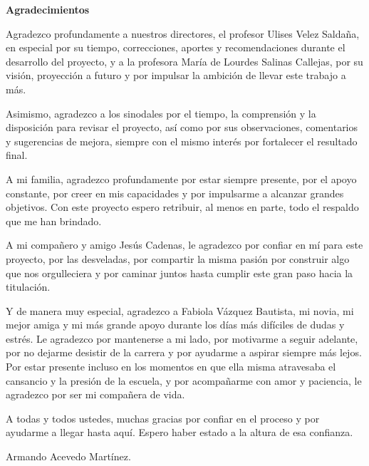 \clearpage
\thispagestyle{fancy}
\begin{center}
    \textbf{\large Agradecimientos}
\end{center}
\vspace{0.5em}

Agradezco profundamente a nuestros directores, el profesor Ulises Velez Saldaña, en especial por su tiempo, correcciones, aportes y recomendaciones durante el desarrollo del proyecto, y a la profesora María de Lourdes Salinas Callejas, por su visión, proyección a futuro y por impulsar la ambición de llevar este trabajo a más.

\bigskip

Asimismo, agradezco a los sinodales por el tiempo, la comprensión y la disposición para revisar el proyecto, así como por sus observaciones, comentarios y sugerencias de mejora, siempre con el mismo interés por fortalecer el resultado final.

\bigskip

A mi familia, agradezco profundamente por estar siempre presente, por el apoyo constante, por creer en mis capacidades y por impulsarme a alcanzar grandes objetivos. Con este proyecto espero retribuir, al menos en parte, todo el respaldo que me han brindado.

\bigskip

A mi compañero y amigo Jesús Cadenas, le agradezco por confiar en mí para este proyecto, por las desveladas, por compartir la misma pasión por construir algo que nos orgulleciera y por caminar juntos hasta cumplir este gran paso hacia la titulación.

\bigskip

Y de manera muy especial, agradezco a Fabiola Vázquez Bautista, mi novia, mi mejor amiga y mi más grande apoyo durante los días más difíciles de dudas y estrés. Le agradezco por mantenerse a mi lado, por motivarme a seguir adelante, por no dejarme desistir de la carrera y por ayudarme a aspirar siempre más lejos. Por estar presente incluso en los momentos en que ella misma atravesaba el cansancio y la presión de la escuela, y por acompañarme con amor y paciencia, le agradezco por ser mi compañera de vida.

\bigskip

A todas y todos ustedes, muchas gracias por confiar en el proceso y por ayudarme a llegar hasta aquí. Espero haber estado a la altura de esa confianza.

\bigskip

\begin{flushright}
Armando Acevedo Martínez.
\end{flushright}

